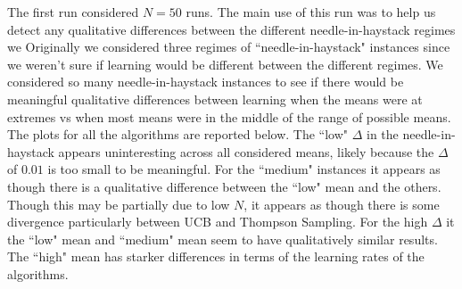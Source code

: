 \documentclass[11pt,letterpaper]{article}
\begin{document}
The first run considered $N=50$ runs. The main use of this run was to help us detect any qualitative differences between the different needle-in-haystack regimes we  Originally we considered three regimes of ``needle-in-haystack" instances since we weren't sure if learning would be different between the different regimes. We considered so many needle-in-haystack instances to see if there would be meaningful qualitative differences between learning when the means were at extremes vs when most means were in the middle of the range of possible means. \\

The plots for all the algorithms are reported below. The ``low" $\Delta$ in the needle-in-haystack appears uninteresting across all considered means, likely because the $\Delta$ of $0.01$ is too small to be meaningful. For the ``medium" instances it appears as though there is a qualitative difference between the ``low" mean and the others. Though this may be partially due to low $N$, it appears as though there is some divergence particularly between UCB and Thompson Sampling. For the high $\Delta$ it the ``low" mean and ``medium" mean seem to have qualitatively similar results. The ``high" mean has starker differences in terms of the learning rates of the algorithms. \\
\end{document}

